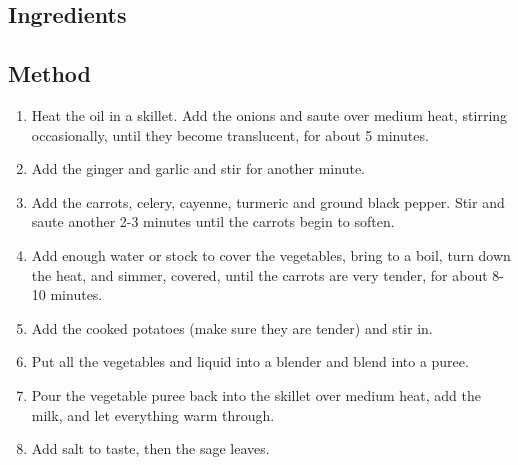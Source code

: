 \documentclass[11pt,a4paper]{article}
\begin{document}
\subsection*{Ingredients}


\medskip

\subsection*{Method}

\begin{enumerate}
  \item Heat the oil in a skillet. Add the onions and saute over medium heat, stirring occasionally, until they become translucent, for about 5 minutes.
  \item Add the ginger and garlic and stir for another minute.
  \item Add the carrots, celery, cayenne, turmeric and ground black pepper. Stir and saute another 2-3 minutes until the carrots begin to soften.
  \item Add enough water or stock to cover the vegetables, bring to a boil, turn down the heat, and simmer, covered, until the carrots are very tender, for about 8-10 minutes.
  \item Add the cooked potatoes (make sure they are tender) and stir in.
  \item Put all the vegetables and liquid into a blender and blend into a puree.
  \item Pour the vegetable puree back into the skillet over medium heat, add the milk, and let everything warm through.
  \item Add salt to taste, then the sage leaves.
\end{enumerate}
\end{document}
